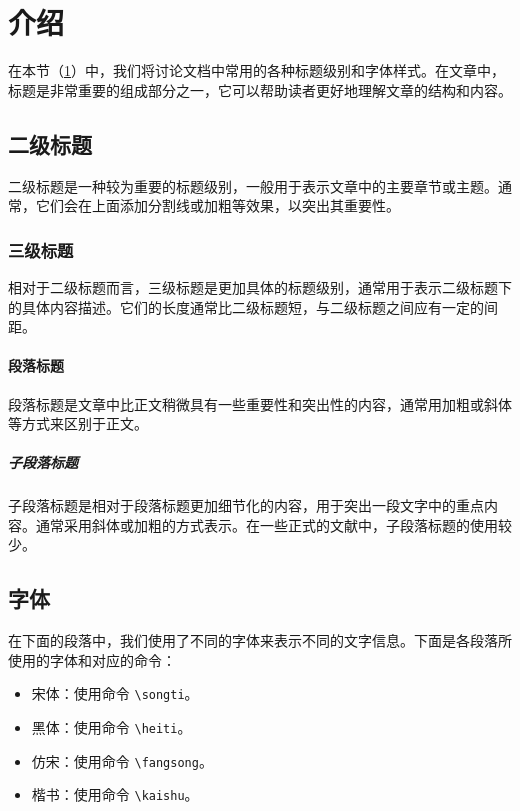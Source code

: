 \section{介绍}\label{sec:introduction}

在本节（\cref{sec:introduction}）中，我们将讨论文档中常用的各种标题级别和字体样式。在文章中，标题是非常重要的组成部分之一，它可以帮助读者更好地理解文章的结构和内容。

\subsection{二级标题}

二级标题是一种较为重要的标题级别，一般用于表示文章中的主要章节或主题。通常，它们会在上面添加分割线或加粗等效果，以突出其重要性。

\subsubsection{三级标题}

相对于二级标题而言，三级标题是更加具体的标题级别，通常用于表示二级标题下的具体内容描述。它们的长度通常比二级标题短，与二级标题之间应有一定的间距。

\paragraph{段落标题}

段落标题是文章中比正文稍微具有一些重要性和突出性的内容，通常用加粗或斜体等方式来区别于正文。

\subparagraph{子段落标题}

子段落标题是相对于段落标题更加细节化的内容，用于突出一段文字中的重点内容。通常采用斜体或加粗的方式表示。在一些正式的文献中，子段落标题的使用较少。

\subsection{字体}

在下面的段落中，我们使用了不同的字体来表示不同的文字信息。下面是各段落所使用的字体和对应的命令：

\begin{itemize}
\item {\songti 宋体}：使用命令 \texttt{\textbackslash songti}。
\item {\heiti 黑体}：使用命令 \texttt{\textbackslash heiti}。
\item {\fangsong 仿宋}：使用命令 \texttt{\textbackslash fangsong}。
\item {\kaishu 楷书}：使用命令 \texttt{\textbackslash kaishu}。
\end{itemize}

